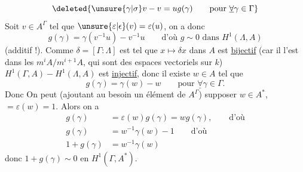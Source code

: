 \[
\deleted{\unsure{\gamma|\sigma}v-v=ug(\gamma)\qquad\text{pour }\underline{\forall}\gamma\in\Gamma}
\]
Soit $v\in A^\Gamma$ tel que $\unsure{\varepsilon|\epsilon}(v)=\varepsilon(u)$, on a donc
\[
g(\gamma)=\gamma(v^{-1}u)-v^{-1}u\qquad\text{d'où }g\sim0\text{ dans }H^1(\Lambda,A)
\]
(additif !). Comme $\delta=[\Gamma:\Lambda]$ est tel que $x\mapsto\delta x$ dans $A$ est \uline{bijectif} (car il l'est dans les $m^iA/m^{i+1}A$, qui sont des espaces vectoriels sur $k$)  $H^1(\Gamma,A)\mathbin{-}H^1(\Lambda,A)$ est \uline{injectif}, donc il existe $w\in A$ tel que
\[
g(\gamma)=\gamma(w)-w\qquad\text{pour }\underline{\forall}\gamma\in\Gamma.
\]
Donc  On peut (ajoutant au besoin  un élément de $A^\Gamma$) supposer $w\in A^*$,   $=\varepsilon(w)=1$. Alors on a  
\[
\begin{aligned}
g(\gamma)&=\varepsilon(w)g(\gamma)=wg(\gamma),\qquad\text{d'où}\\
g(\gamma)&=w^{-1}\gamma(w)-1\qquad\text{d'où}\\
1+g(\gamma)&=w^{-1}\gamma(w)
\end{aligned}
\]
donc $1+g(\gamma)\sim0$ en $H^1(\Gamma,A^*)$.
